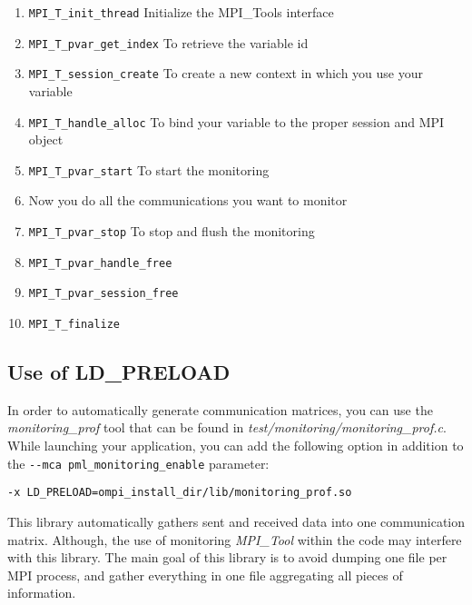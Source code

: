 \documentclass[notitlepage]{article}
\newcommand{\mpit}[1]{\textit{MPI\_Tool#1}}
\newcommand{\brkunds}[0]{\allowbreak\_}
\begin{document}
\begin{enumerate}
\item {\texttt{MPI\brkunds{}T\brkunds{}init\brkunds{}thread}}
  Initialize the MPI\brkunds{}Tools interface
\item
  {\texttt{MPI\brkunds{}T\brkunds{}pvar\brkunds{}get\brkunds{}index}}
  To retrieve the variable id
\item {\texttt{MPI\brkunds{}T\brkunds{}session\brkunds{}create}} To
  create a new context in which you use your variable
\item {\texttt{MPI\brkunds{}T\brkunds{}handle\brkunds{}alloc}} To bind
  your variable to the proper session and MPI object
\item {\texttt{MPI\brkunds{}T\brkunds{}pvar\brkunds{}start}} To start
  the monitoring
\item Now you do all the communications you want to monitor
\item {\texttt{MPI\brkunds{}T\brkunds{}pvar\brkunds{}stop}} To stop
  and flush the monitoring
\item
  {\texttt{MPI\brkunds{}T\brkunds{}pvar\brkunds{}handle\brkunds{}free}}
\item
  {\texttt{MPI\brkunds{}T\brkunds{}pvar\brkunds{}session\brkunds{}free}}
\item {\texttt{MPI\brkunds{}T\brkunds{}finalize}}
\end{enumerate}

\subsection{Use of \textsc{LD\brkunds{}PRELOAD}}
\label{subsec:ldpreload}

In order to automatically generate communication matrices, you can use
the {\it monitoring\brkunds{}prof} tool that can be found in
\textit{test/monitoring/monitoring\brkunds{}prof.c}. While launching
your application, you can add the following option in addition to the
\texttt{-{}-mca pml\brkunds{}monitoring\brkunds{}enable} parameter:
\begin{description}
\item [\texttt{-x
    LD\_PRELOAD=ompi\_install\_dir/lib/monitoring\_prof.so}]
\end{description}

This library automatically gathers sent and received data into one
communication matrix. Although, the use of monitoring \mpit{} within
the code may interfere with this library. The main goal of this
library is to avoid dumping one file per MPI process, and gather
everything in one file aggregating all pieces of information.
\end{document}
